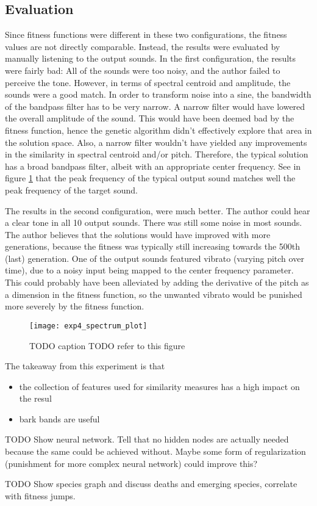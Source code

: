 \subsection{Evaluation}
Since fitness functions were different in these two configurations, the fitness values are not directly comparable. Instead, the results were evaluated by manually listening to the output sounds. In the first configuration, the results were fairly bad: All of the sounds were too noisy, and the author failed to perceive the tone. However, in terms of spectral centroid and amplitude, the sounds were a good match. In order to transform noise into a sine, the bandwidth of the bandpass filter has to be very narrow. A narrow filter would have lowered the overall amplitude of the sound. This would have been deemed bad by the fitness function, hence the genetic algorithm didn't effectively explore that area in the solution space. Also, a narrow filter wouldn't have yielded any improvements in the similarity in spectral centroid and/or pitch. Therefore, the typical solution has a broad bandpass filter, albeit with an appropriate center frequency. See in figure \ref{fig:exp4_spectrum_plot} that the peak frequency of the typical output sound matches well the peak frequency of the target sound.

The results in the second configuration, were much better. The author could hear a clear tone in all 10 output sounds. There was still some noise in most sounds. The author believes that the solutions would have improved with more generations, because the fitness was typically still increasing towards the 500th (last) generation. One of the output sounds featured vibrato (varying pitch over time), due to a noisy input being mapped to the center frequency parameter. This could probably have been alleviated by adding the derivative of the pitch as a dimension in the fitness function, so the unwanted vibrato would be punished more severely by the fitness function.

\begin{figure}[h]
    \centering
    \texttt{[image: exp4\_spectrum\_plot]}
    \caption{TODO caption TODO refer to this figure}
    \label{fig:exp4_spectrum_plot}
\end{figure}

The takeaway from this experiment is that
\begin{itemize}  
\item the collection of features used for similarity measures has a high impact on the resul
\item bark bands are useful
\end{itemize}



TODO Show neural network. Tell that no hidden nodes are actually needed because the same could be achieved without. Maybe some form of regularization (punishment for more complex neural network) could improve this?

TODO Show species graph and discuss deaths and emerging species, correlate with fitness jumps.